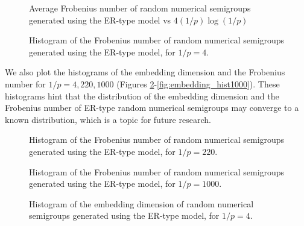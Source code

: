 \begin{figure}
    \begin{center}
        
    \end{center}
    \caption{Average Frobenius number of random numerical semigroups generated using the ER-type model vs $4(1/p)\log(1/p)$}
    \label{fig:frobenius}
\end{figure}


\begin{figure}
    \begin{center}
        
    \end{center}
    \caption{Histogram of the Frobenius number of random numerical semigroups generated using the ER-type model, for $1/p = 4$.}
    \label{fig:frobenius_hist4}
\end{figure}

\newpage

We also plot the histograms of the embedding dimension and the Frobenius number for $1/p = 4, 220, 1000$ (Figures \ref{fig:frobenius_hist4}-\ref{fig:embedding_hist1000}). These histograms hint that the distribution of the embedding dimension and the Frobenius number of ER-type random numerical semigroups may converge to a known distribution, which is a topic for future research. \par

\begin{figure}
    \begin{center}
        
    \end{center}
    \caption{Histogram of the Frobenius number of random numerical semigroups generated using the ER-type model, for $1/p = 220$.}
    \label{fig:frobenius_hist220}
\end{figure}

\begin{figure}
    \begin{center}
        
    \end{center}
    \caption{Histogram of the Frobenius number of random numerical semigroups generated using the ER-type model, for $1/p = 1000$.}
    \label{fig:frobenius_hist1000}
\end{figure}

\begin{figure}
    \begin{center}
        
    \end{center}
    \caption{Histogram of the embedding dimension of random numerical semigroups generated using the ER-type model, for $1/p = 4$.}
    \label{fig:embedding_hist4}
\end{figure}

